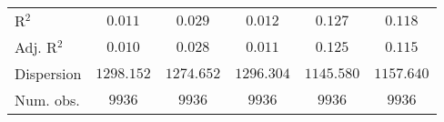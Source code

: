 \begin{center}
\begin{tiny}
\begin{longtable}{l@{} c@{} c@{} c@{} c@{} c@{}}
R$^2$                                           & $0.011$        & $0.029$          & $0.012$        & $0.127$          & $0.118$        \\
Adj. R$^2$                                      & $0.010$        & $0.028$          & $0.011$        & $0.125$          & $0.115$        \\
Dispersion                                      & $1298.152$     & $1274.652$       & $1296.304$     & $1145.580$       & $1157.640$     \\
Num. obs.                                       & $9936$         & $9936$           & $9936$         & $9936$           & $9936$         \\
\end{longtable}
\end{tiny}
\end{center}
